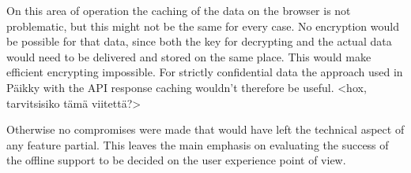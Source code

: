 On this area of operation the caching of the data on the browser is not problematic, but this might not be the same for every case. No encryption would be possible for that data, since both the key for decrypting and the actual data would need to be delivered and stored on the same place. This would make efficient encrypting impossible. For strictly confidential data the approach used in Päikky with the API response caching wouldn't therefore be useful.  <hox, tarvitsisiko tämä viitettä?>

Otherwise no compromises were made that would have left the technical aspect of any feature partial. This leaves the main emphasis on evaluating the success of the offline support to be decided on the user experience point of view.



 

